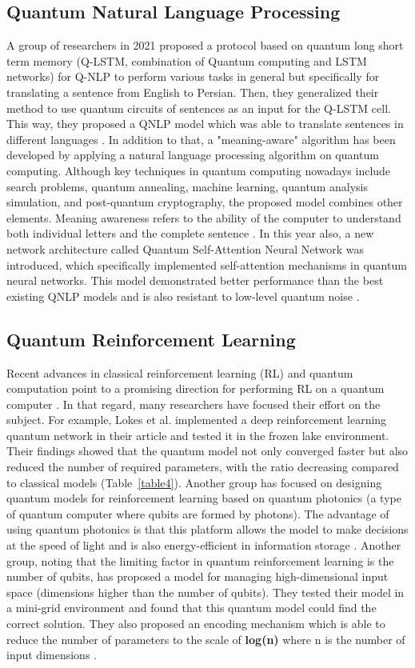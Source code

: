\documentclass[conference]{IEEEtran}
\begin{document}
\subsection{Quantum Natural Language Processing}
A group of researchers in 2021 proposed a protocol based on quantum long short term memory (Q-LSTM, combination of Quantum computing and LSTM networks) for Q-NLP to perform various tasks in general but specifically for translating a sentence from English to Persian. Then, they generalized their method to use quantum circuits of sentences as an input for the Q-LSTM cell. This way, they proposed a QNLP model which was able to translate sentences in different languages \cite{b26}. In addition to that, a "meaning-aware" algorithm has been developed by applying a natural language processing algorithm on quantum computing. Although key techniques in quantum computing nowadays include search problems, quantum annealing, machine learning, quantum analysis simulation, and post-quantum cryptography, the proposed model combines other elements. Meaning awareness refers to the ability of the computer to understand both individual letters and the complete sentence \cite{b27}. In this year also, a new network architecture called Quantum Self-Attention Neural Network was introduced, which specifically implemented self-attention mechanisms in quantum neural networks. This model demonstrated better performance than the best existing QNLP models and is also resistant to low-level quantum noise \cite{b28}.

\subsection{Quantum Reinforcement Learning}
Recent advances in classical reinforcement learning (RL) and quantum computation point to a promising direction for performing RL on a quantum computer \cite{b32}. In that regard, many researchers have focused their effort on the subject. For example, Lokes et al. implemented a deep reinforcement learning quantum network in their article and tested it in the frozen lake environment. Their findings showed that the quantum model not only converged faster but also reduced the number of required parameters, with the ratio decreasing compared to classical models \cite{b33} (Table~\ref{table4}). Another group has focused on designing quantum models for reinforcement learning based on quantum photonics (a type of quantum computer where qubits are formed by photons). The advantage of using quantum photonics is that this platform allows the model to make decisions at the speed of light and is also energy-efficient in information storage \cite{b34}. Another group, noting that the limiting factor in quantum reinforcement learning is the number of qubits, has proposed a model for managing high-dimensional input space (dimensions higher than the number of qubits). They tested their model in a mini-grid environment and found that this quantum model could find the correct solution. They also proposed an encoding mechanism which is able to reduce the number of parameters to the scale of \textbf{log(n)} where n is the number of input dimensions \cite{b32}.
\end{document}
